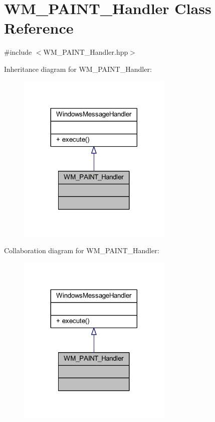 \hypertarget{class_w_m___p_a_i_n_t___handler}{}\section{W\+M\+\_\+\+P\+A\+I\+N\+T\+\_\+\+Handler Class Reference}
\label{class_w_m___p_a_i_n_t___handler}


{\ttfamily \#include $<$W\+M\+\_\+\+P\+A\+I\+N\+T\+\_\+\+Handler.\+hpp$>$}



Inheritance diagram for W\+M\+\_\+\+P\+A\+I\+N\+T\+\_\+\+Handler\+:\nopagebreak
\begin{figure}[H]
\begin{center}
\leavevmode
\includegraphics[width=209pt]{class_w_m___p_a_i_n_t___handler__inherit__graph}
\end{center}
\end{figure}


Collaboration diagram for W\+M\+\_\+\+P\+A\+I\+N\+T\+\_\+\+Handler\+:\nopagebreak
\begin{figure}[H]
\begin{center}
\leavevmode
\includegraphics[width=209pt]{class_w_m___p_a_i_n_t___handler__coll__graph}
\end{center}
\end{figure}
